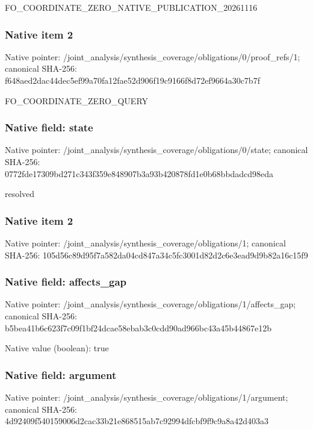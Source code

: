 \documentclass[10pt,a4paper]{article}
\begin{document}
\begingroup\raggedright\sloppy FO\_\allowbreak{}COORDINATE\_\allowbreak{}ZERO\_\allowbreak{}NATIVE\_\allowbreak{}PUBLICATION\_\allowbreak{}20261116\par\endgroup

\subsubsection{Native item 2}
Native pointer: /joint\_\allowbreak{}analysis/synthesis\_\allowbreak{}coverage/obligations/0/proof\_\allowbreak{}refs/1; canonical SHA-256: f648aed2dac44dec5ef99a70fa12fae52d906f19c9166f8d72ef9664a30c7b7f

\begingroup\raggedright\sloppy FO\_\allowbreak{}COORDINATE\_\allowbreak{}ZERO\_\allowbreak{}QUERY\par\endgroup

\subsubsection{Native field: state}
Native pointer: /joint\_\allowbreak{}analysis/synthesis\_\allowbreak{}coverage/obligations/0/state; canonical SHA-256: 0772fde17309bd271c343f359e848907b3a93b420878fd1e0b68bbdadcd98eda

\begingroup\raggedright\sloppy resolved\par\endgroup

\subsubsection{Native item 2}
Native pointer: /joint\_\allowbreak{}analysis/synthesis\_\allowbreak{}coverage/obligations/1; canonical SHA-256: 105d56c89d95f7a582da04cd847a34c5fc3001d82d2c6e3ead9d9b82a16c15f9

\subsubsection{Native field: affects\_\allowbreak{}gap}
Native pointer: /joint\_\allowbreak{}analysis/synthesis\_\allowbreak{}coverage/obligations/1/affects\_\allowbreak{}gap; canonical SHA-256: b5bea41b6c623f7c09f1bf24dcae58ebab3c0cdd90ad966bc43a45b44867e12b

Native value (boolean): true

\subsubsection{Native field: argument}
Native pointer: /joint\_\allowbreak{}analysis/synthesis\_\allowbreak{}coverage/obligations/1/argument; canonical SHA-256: 4d92409f540159006d2cac33b21e868515ab7c92994dfcbf9f9c9a8a42d403a3
\end{document}
